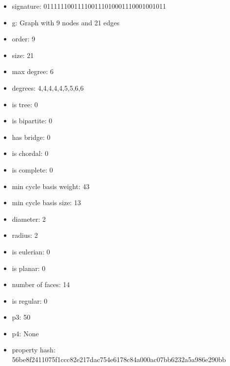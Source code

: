 \newpage
\begin{figure}
\end{figure}
\begin{itemize}
\item signature: 011111100111100111010001110001001011
\item g: Graph with 9 nodes and 21 edges
\item order: 9
\item size: 21
\item max degree: 6
\item degrees: 4,4,4,4,4,5,5,6,6
\item is tree: 0
\item is bipartite: 0
\item has bridge: 0
\item is chordal: 0
\item is complete: 0
\item min cycle basis weight: 43
\item min cycle basis size: 13
\item diameter: 2
\item radius: 2
\item is eulerian: 0
\item is planar: 0
\item number of faces: 14
\item is regular: 0
\item p3: 50
\item p4: None
\item property hash: 56be8f2411075f1ccc82e217dac754e6178c84a000ac07bb6232a5a986e290bb
\end{itemize}
